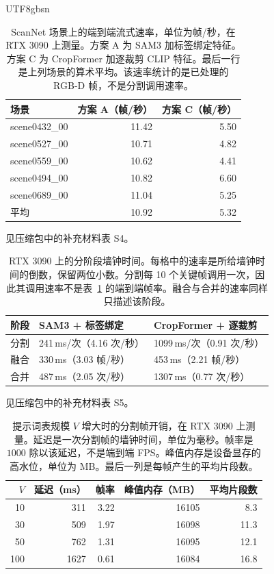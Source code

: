 \documentclass[11pt]{article}
\begin{document}
\begin{CJK*}{UTF8}{gbsn}
\begin{table}[ht]
\centering
\caption{ScanNet 场景上的端到端流式速率，单位为帧/秒，在 RTX 3090 上测量。方案 A 为 SAM3 加标签绑定特征。方案 C 为 CropFormer 加逐裁剪 CLIP 特征。最后一行是上列场景的算术平均。该速率统计的是已处理的 RGB-D 帧，不是分割调用速率。}
\label{tab:fps}
\small
\begin{tabular}{lrr}
\toprule
场景 & 方案 A（帧/秒） & 方案 C（帧/秒） \\
\midrule
scene0432\_00 & 11.42 & 5.50 \\
scene0527\_00 & 10.71 & 4.82 \\
scene0559\_00 & 10.62 & 4.41 \\
scene0494\_00 & 10.82 & 6.60 \\
scene0689\_00 & 11.04 & 5.25 \\
平均 & 10.92 & 5.32 \\
\bottomrule
\end{tabular}
\end{table}

\noindent 见压缩包中的补充材料表 S4。

\begin{table}[ht]
\centering
\caption{RTX 3090 上的分阶段墙钟时间。每格中的速率是所给墙钟时间的倒数，保留两位小数。分割每 10 个关键帧调用一次，因此其调用速率不是表~\ref{tab:fps} 的端到端帧率。融合与合并的速率同样只描述该阶段。}
\label{tab:stages}
\small
\begin{tabular}{lll}
\toprule
阶段 & SAM3 + 标签绑定 & CropFormer + 逐裁剪 \\
\midrule
分割 & 241\,ms/次（4.16 次/秒） & 1099\,ms/次（0.91 次/秒） \\
融合 & 330\,ms（3.03 帧/秒） & 453\,ms（2.21 帧/秒） \\
合并 & 487\,ms（2.05 次/秒） & 1307\,ms（0.77 次/秒） \\
\bottomrule
\end{tabular}
\end{table}

\noindent 见压缩包中的补充材料表 S5。

\begin{table}[ht]
\centering
\caption{提示词表规模 \(V\) 增大时的分割帧开销，在 RTX 3090 上测量。延迟是一次分割帧的墙钟时间，单位为毫秒。帧率是 \(1000\) 除以该延迟，不是端到端 FPS。峰值内存是设备显存的高水位，单位为 MB。最后一列是每帧产生的平均片段数。}
\label{tab:vocab}
\small
\begin{tabular}{rrrrr}
\toprule
\(V\) & 延迟（ms） & 帧率 & 峰值内存（MB） & 平均片段数 \\
\midrule
10 & 311 & 3.22 & 16105 & 8.3 \\
30 & 509 & 1.97 & 16098 & 11.3 \\
50 & 762 & 1.31 & 16095 & 12.1 \\
100 & 1627 & 0.61 & 16084 & 16.8 \\
\bottomrule
\end{tabular}
\end{table}


\end{CJK*}
\end{document}
